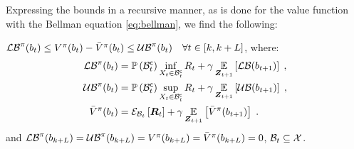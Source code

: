 Expressing the bounds in a recursive manner, as is done for the value function with the Bellman equation \eqref{eq:bellman}, we find the following:
\begin{corollary}
	\label{thm:val_func_bounds_states_bellman}
	$\lowerbound^\pi(\blf{t})\leq V^\pi(\blf{t})-\bar{V}^\pi(\blf{t})\leq\upperbound^\pi(\blf{t})\quad\forall t\in[k,k+L]$, where:
	\begin{subequations}
		\begin{align}
			\lowerbound\nolimits^\pi(\blf{t}) & =\measure{\stcompI{\subSpace}{t}}\inf_{\states{t}\in\stcompI{\subSpace}{t}}R_t+\gamma\expectation{\lowerbound(\blf{t+1})}{\observationsRV{t+1}}\;,\\
			\upperbound\nolimits^\pi(\blf{t}) & =\measure{\stcompI{\subSpace}{t}}\sup_{\states{t}\in\stcompI{\subSpace}{t}}R_t+\gamma\expectation{\upperbound(\blf{t+1})}{\observationsRV{t+1}}\;,\\
			\bar{V}^\pi(\blf{t}) & =\partialexpectation{\boldsymbol{R}_t}{\subSpaceI{t}}
			+\gamma\expectation{\bar{V}^\pi(\blf{t+1})}{\observationsRV{t+1}}\;.
		\end{align}
	\end{subequations}
	and $\lowerbound^\pi(\blf{k+L})=\upperbound^\pi(\blf{k+L})=V^\pi(\blf{k+L})=\bar{V}^\pi(\blf{k+L})=0$, $\subSpaceI{t}\subseteq\stateSpace$.
\end{corollary}
